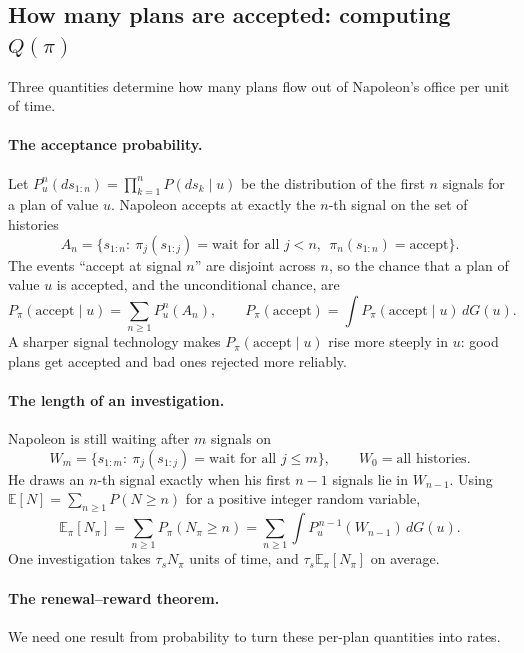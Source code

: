 \documentclass[11pt]{article}
\newcommand{\Nap}{\textcolor{nap}{Napoleon}}
\theoremstyle{remark}
\newcommand{\E}{\mathbb{E}}
\newcommand{\accept}{\text{accept}}
\begin{document}
\subsection{\texorpdfstring{How many plans are accepted: computing $Q(\pi)$}{How many plans are accepted: computing Q}}

Three quantities determine how many plans flow out of \Nap's office per unit of time.

\paragraph{The acceptance probability.} Let $P_u^n(ds_{1:n})=\prod_{k=1}^nP(ds_k\mid u)$ be the distribution of the first $n$ signals for a plan of value $u$. \Nap{} accepts at exactly the $n$-th signal on the set of histories
\[
A_n=\big\{s_{1:n}:\ \pi_j(s_{1:j})=\text{wait for all }j<n,\ \ \pi_n(s_{1:n})=\accept\big\}.
\]
The events ``accept at signal $n$'' are disjoint across $n$, so the chance that a plan of value $u$ is accepted, and the unconditional chance, are
\begin{equation}\label{eq:paccept}
P_\pi(\accept\mid u)=\sum_{n\ge1}P_u^n(A_n),\qquad P_\pi(\accept)=\int P_\pi(\accept\mid u)\,dG(u).
\end{equation}
A sharper signal technology makes $P_\pi(\accept\mid u)$ rise more steeply in $u$: good plans get accepted and bad ones rejected more reliably.

\paragraph{The length of an investigation.} \Nap{} is still waiting after $m$ signals on
\[
W_m=\big\{s_{1:m}:\ \pi_j(s_{1:j})=\text{wait for all }j\le m\big\},\qquad W_0=\text{all histories}.
\]
He draws an $n$-th signal exactly when his first $n-1$ signals lie in $W_{n-1}$. Using $\E[N]=\sum_{n\ge1}P(N\ge n)$ for a positive integer random variable,
\begin{equation}\label{eq:EN}
\E_\pi[N_\pi]=\sum_{n\ge1}P_\pi(N_\pi\ge n)=\sum_{n\ge1}\int P_u^{\,n-1}(W_{n-1})\,dG(u).
\end{equation}
One investigation takes $\tau_sN_\pi$ units of time, and $\tau_s\E_\pi[N_\pi]$ on average.

\paragraph{The renewal--reward theorem.} We need one result from probability to turn these per-plan quantities into rates.
\end{document}
